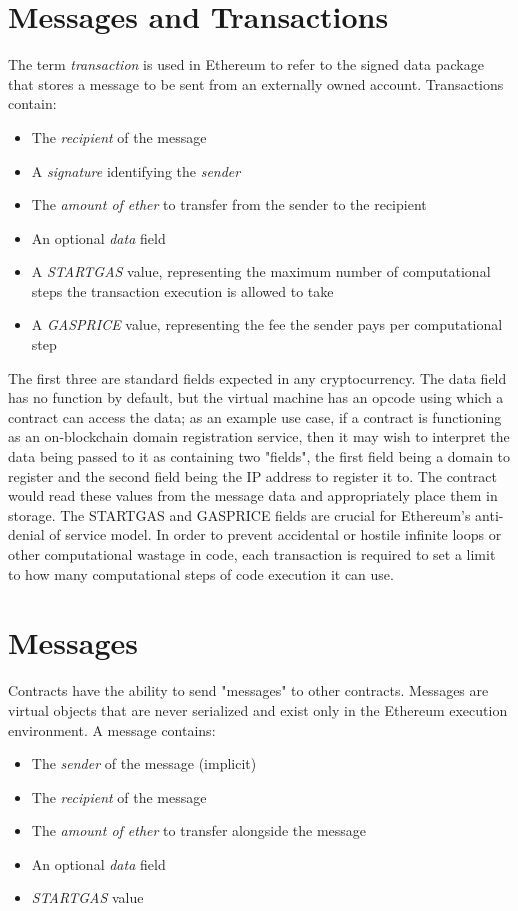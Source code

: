 \section{Messages and Transactions}
The term \textit{transaction} is used in Ethereum to refer to the signed data package that stores a message to be sent from an externally owned account. Transactions contain:
\begin{itemize}
    \item The \textit{recipient} of the message
    \item A \textit{signature} identifying the \textit{sender}
    \item The \textit{amount of ether} to transfer from the sender to the recipient
    \item An optional \textit{data} field
    \item A \textit{STARTGAS} value, representing the maximum number of computational steps the transaction execution is allowed to take
    \item A \textit{GASPRICE} value, representing the fee the sender pays per computational step
\end{itemize}

The first three are standard fields expected in any cryptocurrency. The data field has no function by default, but the virtual machine has an opcode using which a contract can access the data; as an example use case, if a contract is functioning as an on-blockchain domain registration service, then it may wish to interpret the data being passed to it as containing two "fields", the first field being a domain to register and the second field being the IP address to register it to. The contract would read these values from the message data and appropriately place them in storage. \newline
The STARTGAS and GASPRICE fields are crucial for Ethereum's anti-denial of service model. In order to prevent accidental or hostile infinite loops or other computational wastage in code, each transaction is required to set a limit to how many computational steps of code execution it can use. 

\section{Messages}
Contracts have the ability to send "messages" to other contracts. Messages are virtual objects that are never serialized and exist only in the Ethereum execution environment. A message contains:
\begin{itemize}
    \item The \textit{sender} of the message (implicit)
    \item The \textit{recipient} of the message
    \item The \textit{amount of ether} to transfer alongside the message
    \item An optional \textit{data} field
    \item \textit{STARTGAS} value
\end{itemize}

